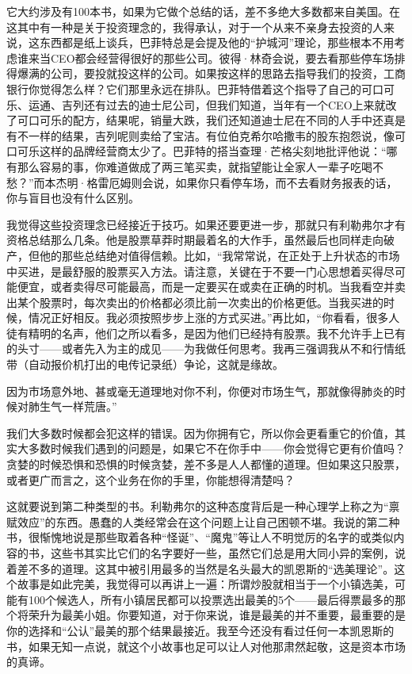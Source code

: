 它大约涉及有100本书，如果为它做个总结的话，差不多绝大多数都来自美国。在这其中有一种是关于投资理念的，我得承认，对于一个从来不亲身去投资的人来说，这东西都是纸上谈兵，巴菲特总是会提及他的``护城河''理论，那些根本不用考虑谁来当CEO都会经营得很好的那些公司。彼得·林奇会说，要去看那些停车场排得爆满的公司，要投就投这样的公司。如果按这样的思路去指导我们的投资，工商银行你觉得怎么样？它们那里永远在排队。巴菲特借着这个指导了自己的可口可乐、运通、吉列还有过去的迪士尼公司，但我们知道，当年有一个CEO上来就改了可口可乐的配方，结果呢，销量大跌，我们还知道迪士尼在不同的人手中还真是有不一样的结果，吉列呢则卖给了宝洁。有位伯克希尔哈撒韦的股东抱怨说，像可口可乐这样的品牌经营商太少了。巴菲特的搭当查理·芒格尖刻地批评他说：``哪有那么容易的事，你难道做成了两三笔买卖，就指望能让全家人一辈子吃喝不愁？''而本杰明·格雷厄姆则会说，如果你只看停车场，而不去看财务报表的话，你与盲目也没有什么区别。

我觉得这些投资理念已经接近于技巧。如果还要更进一步，那就只有利勒弗尔才有资格总结那么几条。他是股票草莽时期最着名的大作手，虽然最后也同样走向破产，但他的那些总结绝对值得信赖。比如，``我常常说，在正处于上升状态的市场中买进，是最舒服的股票买入方法。请注意，关键在于不要一门心思想着买得尽可能便宜，或者卖得尽可能最高，而是一定要买在或卖在正确的时机。当我看空并卖出某个股票时，每次卖出的价格都必须比前一次卖出的价格更低。当我买进的时候，情况正好相反。我必须按照步步上涨的方式买进。''再比如，``你看看，很多人徒有精明的名声，他们之所以看多，是因为他们已经持有股票。我不允许手上已有的头寸------或者先入为主的成见------为我做任何思考。我再三强调我从不和行情纸带（自动报价机打出的电传记录纸）争论，这就是缘故。

因为市场意外地、甚或毫无道理地对你不利，你便对市场生气，那就像得肺炎的时候对肺生气一样荒唐。''

我们大多数时候都会犯这样的错误。因为你拥有它，所以你会更看重它的价值，其实大多数时候我们遇到的问题是，如果它不在你手中------你会觉得它更有价值吗？贪婪的时候恐惧和恐惧的时候贪婪，差不多是人人都懂的道理。但如果这只股票，或者更广而言之，这个业务在你的手里，你能想得清楚吗？

这就要说到第二种类型的书。利勒弗尔的这种态度背后是一种心理学上称之为``禀赋效应''的东西。愚蠢的人类经常会在这个问题上让自己困顿不堪。我说的第二种书，很惭愧地说是那些取着各种``怪诞''、``魔鬼''等让人不明觉厉的名字的或类似内容的书，这些书其实比它们的名字要好一些，虽然它们总是用大同小异的案例，说着差不多的道理。这其中被引用最多的当然是名头最大的凯恩斯的``选美理论''。这个故事是如此完美，我觉得可以再讲上一遍：所谓炒股就相当于一个小镇选美，可能有100个候选人，所有小镇居民都可以投票选出最美的5个------最后得票最多的那个将荣升为最美小姐。你要知道，对于你来说，谁是最美的并不重要，最重要的是你的选择和``公认''最美的那个结果最接近。我至今还没有看过任何一本凯恩斯的书，如果无知一点说，就这个小故事也足可以让人对他那肃然起敬，这是资本市场的真谛。

